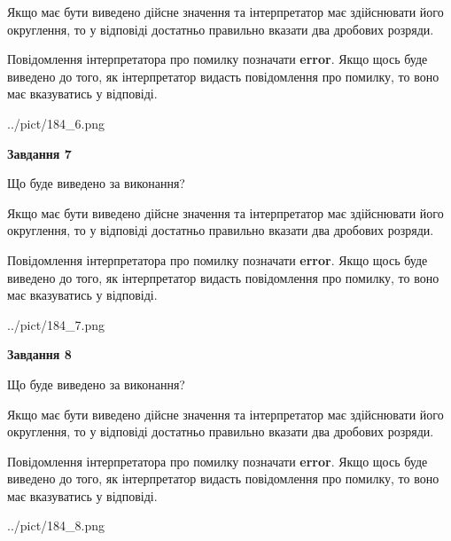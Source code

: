 \documentclass[12pt, ukrainian]{article}
\begin{document}
{\begin {Large}
Якщо має бути виведено дійсне значення та інтерпретатор має здійснювати його округлення, 
то у відповіді достатньо правильно вказати два дробових розряди.

Повідомлення інтерпретатора про помилку позначати \textbf{error}.
Якщо щось буде виведено до того, як інтерпретатор видасть повідомлення про помилку, 
то воно має вказуватись у відповіді. \par

\begin{center}
	{../pict/184_6.png}
\end{center}
\newpage

{\begin {center}\textbf{Завдання 7}\end {center}}\par
Що буде виведено за виконання? \par

Якщо має бути виведено дійсне значення та інтерпретатор має здійснювати його округлення, 
то у відповіді достатньо правильно вказати два дробових розряди.

Повідомлення інтерпретатора про помилку позначати \textbf{error}.
Якщо щось буде виведено до того, як інтерпретатор видасть повідомлення про помилку, 
то воно має вказуватись у відповіді. \par

\begin{center}
	{../pict/184_7.png}
\end{center}
\newpage

{\begin {center}\textbf{Завдання 8}\end {center}}\par
Що буде виведено за виконання? \par

Якщо має бути виведено дійсне значення та інтерпретатор має здійснювати його округлення, 
то у відповіді достатньо правильно вказати два дробових розряди.

Повідомлення інтерпретатора про помилку позначати \textbf{error}.
Якщо щось буде виведено до того, як інтерпретатор видасть повідомлення про помилку, 
то воно має вказуватись у відповіді. \par

\begin{center}
	{../pict/184_8.png}
\end{center}
\newpage


\end{Large}}
\end{document}
